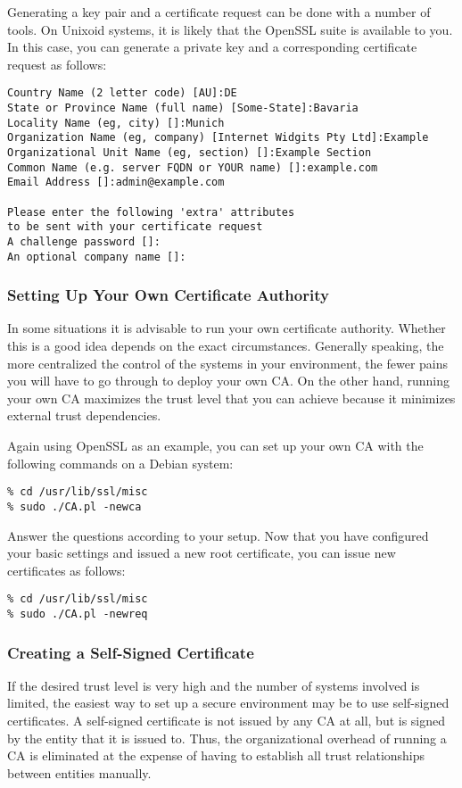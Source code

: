 Generating a key pair and a certificate request can be done with a number
of tools.  On Unixoid systems, it is likely that the OpenSSL suite is
available to you.  In this case, you can generate a private key and a
corresponding certificate request as follows:

\begin{lstlisting}[breaklines]
% openssl req -new -nodes -keyout <servername>.key -out <servername>.csr -newkey rsa:<keysize>
Country Name (2 letter code) [AU]:DE
State or Province Name (full name) [Some-State]:Bavaria
Locality Name (eg, city) []:Munich
Organization Name (eg, company) [Internet Widgits Pty Ltd]:Example
Organizational Unit Name (eg, section) []:Example Section
Common Name (e.g. server FQDN or YOUR name) []:example.com
Email Address []:admin@example.com

Please enter the following 'extra' attributes
to be sent with your certificate request
A challenge password []:
An optional company name []:
\end{lstlisting}

\subsubsection{Setting Up Your Own Certificate Authority}
\label{sec:setupownca}
In some situations it is advisable to run your own certificate authority.
Whether this is a good idea depends on the exact circumstances.  Generally
speaking, the more centralized the control of the systems in your
environment, the fewer pains you will have to go through to deploy your own
CA.  On the other hand, running your own CA maximizes the trust level that
you can achieve because it minimizes external trust dependencies.

Again using OpenSSL as an example, you can set up your own CA with the
following commands on a Debian system:

\begin{lstlisting}
% cd /usr/lib/ssl/misc
% sudo ./CA.pl -newca
\end{lstlisting}

Answer the questions according to your setup. Now that you have configured your basic settings and 
issued a new root certificate, you can issue new certificates as follows:

\begin{lstlisting}
% cd /usr/lib/ssl/misc
% sudo ./CA.pl -newreq
\end{lstlisting}

\subsubsection{Creating a Self-Signed Certificate}
\label{sec:pki:selfsignedcert}
If the desired trust level is very high and the number of systems involved
is limited, the easiest way to set up a secure environment may be to use
self-signed certificates.  A self-signed certificate is not issued by any
CA at all, but is signed by the entity that it is issued to.  Thus, the
organizational overhead of running a CA is eliminated at the expense of
having to establish all trust relationships between entities manually.


